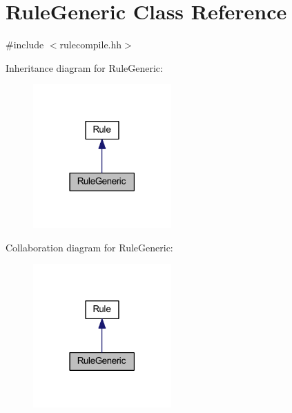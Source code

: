 \hypertarget{class_rule_generic}{}\section{Rule\+Generic Class Reference}
\label{class_rule_generic}


{\ttfamily \#include $<$rulecompile.\+hh$>$}



Inheritance diagram for Rule\+Generic\+:
\nopagebreak
\begin{figure}[H]
\begin{center}
\leavevmode
\includegraphics[width=150pt]{class_rule_generic__inherit__graph}
\end{center}
\end{figure}


Collaboration diagram for Rule\+Generic\+:
\nopagebreak
\begin{figure}[H]
\begin{center}
\leavevmode
\includegraphics[width=150pt]{class_rule_generic__coll__graph}
\end{center}
\end{figure}
